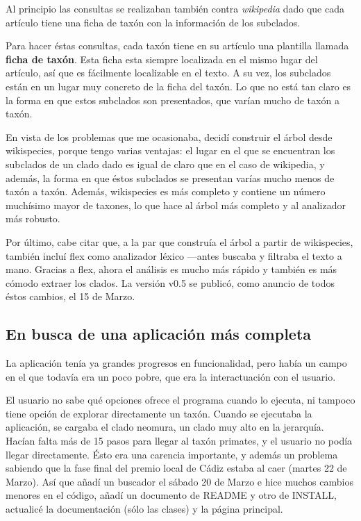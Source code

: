 Al principio las consultas se realizaban también contra
\textit{wikipedia} dado que cada artículo tiene una ficha de taxón con
la información de los subclados.

Para hacer éstas consultas, cada taxón tiene en su artículo una
plantilla llamada \textbf{ficha de taxón}. Esta ficha esta siempre
localizada en el mismo lugar del artículo, así que es fácilmente
localizable en el texto. A su vez, los subclados están en un lugar muy
concreto de la ficha del taxón. Lo que no está tan claro es la forma
en que estos subclados son presentados, que varían mucho de taxón a
taxón.

En vista de los problemas que me ocasionaba, decidí construir el árbol
desde wikispecies, porque tengo varias ventajas: el lugar en el que se
encuentran los subclados de un clado dado es igual de claro que en el
caso de wikipedia, y además, la forma en que éstos subclados se
presentan varías mucho menos de taxón a taxón. Además, wikispecies es
más completo y contiene un número muchísimo mayor de taxones, lo que
hace al árbol más completo y al analizador más robusto.

Por último, cabe citar que, a la par que construía el árbol a partir
de wikispecies, también incluí flex como analizador léxico \----antes
buscaba y filtraba el texto a mano. Gracias a flex, ahora el análisis
es mucho más rápido y también es más cómodo extraer los clados. La
versión v0.5 se publicó, como anuncio de todos éstos cambios, el 15 de
Marzo.

\subsection{En busca de una aplicación más completa}
La aplicación tenía ya grandes progresos en funcionalidad, pero había
un campo en el que todavía era un poco pobre, que era la
interactuación con el usuario.

El usuario no sabe qué opciones ofrece el programa cuando lo ejecuta,
ni tampoco tiene opción de explorar directamente un taxón. Cuando se
ejecutaba la aplicación, se cargaba el clado neomura, un clado muy
alto en la jerarquía. Hacían falta más de 15 pasos para llegar al
taxón primates, y el usuario no podía llegar directamente. Ésto era
una carencia importante, y además un problema sabiendo que la fase
final del premio local de Cádiz estaba al caer (martes 22 de
Marzo). Así que añadí un buscador el sábado 20 de Marzo e hice muchos
cambios menores en el código, añadí un documento de README y otro de
INSTALL, actualicé la documentación (sólo las clases) y la página
principal.

